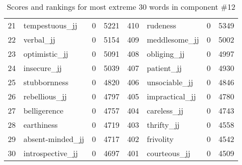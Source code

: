 \begin{table}[tbp]
\begin{tabular}{| rlr@{.}l | rlr@{.}l |}
    21 & tempestuous\_jj & 0 & 5221    &    410 & rudeness & 0 & 5349 \\
    22 & verbal\_jj & 0 & 5154    &    409 & meddlesome\_jj & 0 & 5002 \\
    23 & optimistic\_jj & 0 & 5091    &    408 & obliging\_jj & 0 & 4997 \\
    24 & insecure\_jj & 0 & 5039    &    407 & patient\_jj & 0 & 4930 \\
    25 & stubbornness & 0 & 4820    &    406 & unsociable\_jj & 0 & 4846 \\
    26 & rebellious\_jj & 0 & 4797    &    405 & impractical\_jj & 0 & 4780 \\
    27 & belligerence & 0 & 4757    &    404 & careless\_jj & 0 & 4743 \\
    28 & earthiness & 0 & 4719    &    403 & thrifty\_jj & 0 & 4558 \\
    29 & absent-minded\_jj & 0 & 4717    &    402 & frivolity & 0 & 4542 \\
    30 & introspective\_jj & 0 & 4697    &    401 & courteous\_jj & 0 & 4509 \\
    \hline
    \end{tabular}
    \caption{Scores and rankings for most extreme 30 words in component \#12} 
\end{table}
\clearpage
